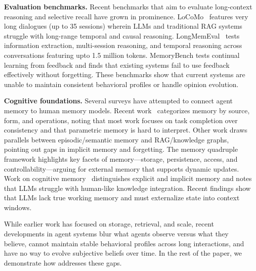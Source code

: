 \textbf{Evaluation benchmarks.} Recent benchmarks that aim to evaluate long-context reasoning and selective recall have grown
in prominence.
LoCoMo~\citep{maharana2024evaluating} features very long dialogues (up to 35 sessions) wherein LLMs and traditional RAG systems struggle with long-range temporal and causal reasoning. LongMemEval~\citep{wu2024longmemeval} tests information extraction, multi-session reasoning, and temporal reasoning across conversations featuring upto 1.5 million tokens. MemoryBench \citep{ai2025memorybench} tests continual learning from feedback and finds that existing systems fail to use feedback effectively without forgetting. These benchmarks show that current systems are unable to maintain consistent behavioral profiles or handle opinion evolution.

\textbf{Cognitive foundations.} Several surveys have attempted to connect agent memory to human memory models. Recent work~\citep{zhang2025survey} categorizes memory by source, form, and operations, noting that most work focuses on task completion over consistency and that parametric memory is hard to interpret. Other work \citep{wu2025human} draws parallels between episodic/semantic memory and RAG/knowledge graphs, pointing out gaps in implicit memory and forgetting. The memory quadruple framework \citep{zhang2025memory} highlights key facets of memory---storage, persistence, access, and controllability---arguing for external memory that supports dynamic updates. Work on cognitive memory~\citep{shan2025cognitive} distinguishes explicit and implicit memory and notes that LLMs struggle with human-like knowledge integration. Recent findings \citep{huang2025llms} show that LLMs lack true working memory and must externalize state into context windows.

While earlier work has focused on storage, retrieval, and scale, recent developments in agent systems blur what agents observe versus what they believe, cannot maintain stable behavioral profiles across long interactions, and have no way to evolve subjective beliefs over time. In the rest of the paper,
we demonstrate how \our addresses these
gaps.
